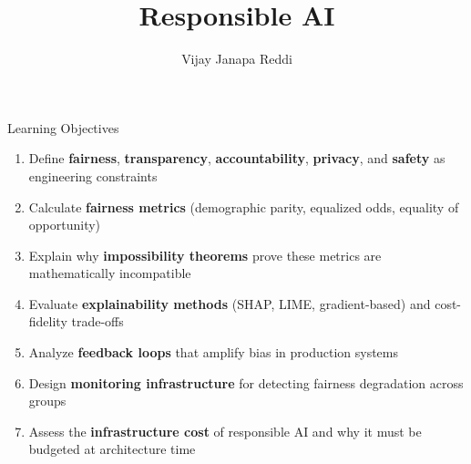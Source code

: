 \documentclass[aspectratio=169, 12pt]{beamer}
\title{Responsible AI}
\author{Vijay Janapa Reddi}
\institute{Harvard University}
\date{}
\begin{document}

\begin{frame}{Learning Objectives}

\footnotesize
\begin{enumerate}\setlength\itemsep{0pt}
  \item Define \textbf{fairness}, \textbf{transparency}, \textbf{accountability}, \textbf{privacy}, and \textbf{safety} as engineering constraints
  \item Calculate \textbf{fairness metrics} (demographic parity, equalized odds, equality of opportunity)
  \item Explain why \textbf{impossibility theorems} prove these metrics are mathematically incompatible
  \item Evaluate \textbf{explainability methods} (SHAP, LIME, gradient-based) and cost-fidelity trade-offs
  \item Analyze \textbf{feedback loops} that amplify bias in production systems
  \item Design \textbf{monitoring infrastructure} for detecting fairness degradation across groups
  \item Assess the \textbf{infrastructure cost} of responsible AI and why it must be budgeted at architecture time
\end{enumerate}

\end{frame}
\end{document}
